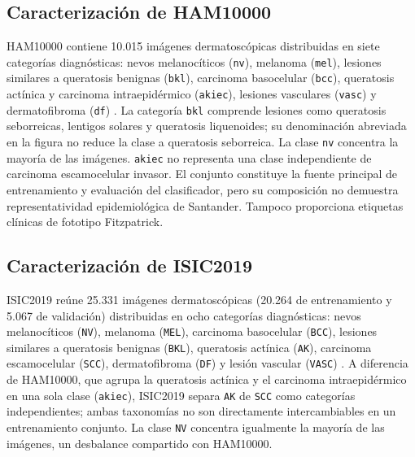 \par{}
\endgroup


\subsection{Caracterización de HAM10000}

HAM10000 contiene 10.015 imágenes dermatoscópicas distribuidas en siete categorías diagnósticas: nevos melanocíticos (\texttt{nv}), melanoma (\texttt{mel}), lesiones similares a queratosis benignas (\texttt{bkl}), carcinoma basocelular (\texttt{bcc}), queratosis actínica y carcinoma intraepidérmico (\texttt{akiec}), lesiones vasculares (\texttt{vasc}) y dermatofibroma (\texttt{df}) \parencite{tschandl2018ham10000}. La categoría \texttt{bkl} comprende lesiones como queratosis seborreicas, lentigos solares y queratosis liquenoides; su denominación abreviada en la figura no reduce la clase a queratosis seborreica. La clase \texttt{nv} concentra la mayoría de las imágenes. \texttt{akiec} no representa una clase independiente de carcinoma escamocelular invasor. El conjunto constituye la fuente principal de entrenamiento y evaluación del clasificador, pero su composición no demuestra representatividad epidemiológica de Santander. Tampoco proporciona etiquetas clínicas de fototipo Fitzpatrick.


\subsection{Caracterización de ISIC2019}

ISIC2019 reúne 25.331 imágenes dermatoscópicas (20.264 de entrenamiento y 5.067 de validación) distribuidas en ocho categorías diagnósticas: nevos melanocíticos (\texttt{NV}), melanoma (\texttt{MEL}), carcinoma basocelular (\texttt{BCC}), lesiones similares a queratosis benignas (\texttt{BKL}), queratosis actínica (\texttt{AK}), carcinoma escamocelular (\texttt{SCC}), dermatofibroma (\texttt{DF}) y lesión vascular (\texttt{VASC}) \parencite{combalia2024bcn20000}. A diferencia de HAM10000, que agrupa la queratosis actínica y el carcinoma intraepidérmico en una sola clase (\texttt{akiec}), ISIC2019 separa \texttt{AK} de \texttt{SCC} como categorías independientes; ambas taxonomías no son directamente intercambiables en un entrenamiento conjunto. La clase \texttt{NV} concentra igualmente la mayoría de las imágenes, un desbalance compartido con HAM10000.




